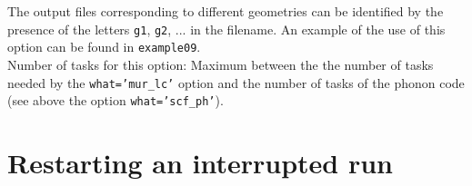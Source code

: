 \documentclass[12pt,a4paper]{article}
\begin{document}
The output files corresponding to different geometries can be identified
by the presence of the letters \texttt{g1}, \texttt{g2}, ... in the filename.
An example of the use of this option can be found in \texttt{example09}. \\
Number of tasks for this option: Maximum between the the number of tasks  
needed by the \texttt{what='mur\_lc'} option and the number
of tasks of the phonon code (see above the option \texttt{what='scf\_ph'}). \\



%
%

\section{Restarting an interrupted run}
\end{document}
